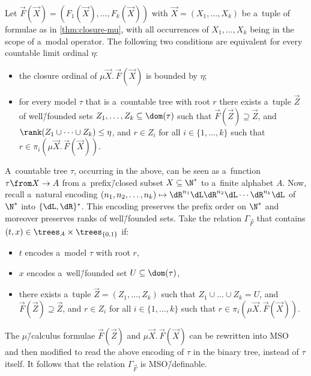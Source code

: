 \begin{cor}\label{cor:mu-tree}
	Let $\vec{F}(\vec{X})=(F_1(\vec{X}),\dots,F_k(\vec{X}))$ with $\vec{X}=(X_1,\dots,X_k)$ be a~tuple of formulae as in \cref{thm:closure-mu}, with all occurrences of $X_1,\dots,X_k$ being in the scope of a~modal operator.
	The following two conditions are equivalent for every countable limit ordinal $\eta$:
	\begin{itemize}
	\item	the closure ordinal of $\mu \vec{X}.\,\vec{F}(\vec{X})$ is bounded by $\eta$;
	\item	for every model $\tau$ that is a~countable tree with root $r$ there exists a~tuple $\vec{Z}$ of well\=/founded sets $Z_1,\dots,Z_k\subseteq\dom(\tau)$
		such that $\vec{F}(\vec{Z})\supseteq\vec{Z}$, and $\rank(Z_1\cup\dots\cup Z_k)\leq\eta$, and $r\in Z_i$ for all $i\in\{1,\dots,k\}$ such that $r\in\pi_i(\mu \vec{X}.\,\vec{F}(\vec{X}))$.
	\end{itemize}
\end{cor}
\noindent %
A~countable tree $\tau$, occurring in the  above, can be seen as a~function $\tau\from X\to A$ from a~prefix\=/closed subset $X\subseteq\N^\ast$ to a~finite alphabet $A$.
Now, recall a~natural encoding $(n_1,n_2,\ldots,n_k)\mapsto \dR^{n_1}\dL\dR^{n_2}\dL\cdots\dR^{n_k}\dL$ of $\N^\ast$ into $\{\dL,\dR\}^\ast$.
This encoding preserves the prefix order on $\N^\ast$ and moreover preserves ranks of well\=/founded sets.
Take the relation $\Gamma_{\!\!\vec{F}}$ that contains $(t,x)\in\trees_A\times\trees_{\{0,1\}}$ if:
\begin{itemize}
\item	$t$ encodes a~model $\tau$ with root $r$,
\item	$x$ encodes a~well\=/founded set $U\subseteq\dom(\tau)$,
\item	there exists a~tuple $\vec{Z}=(Z_1,\dots,Z_k)$ such that $Z_1\cup\dots\cup Z_k=U$, and $\vec{F}(\vec{Z})\supseteq\vec{Z}$,
	and $r\in Z_i$ for all $i\in\{1,\dots,k\}$ such that $r\in\pi_i(\mu \vec{X}.\,\vec{F}(\vec{X}))$.
\end{itemize}
The $\mu$\=/calculus formulae $\vec{F}(\vec{Z})$ and $\mu\vec{X}.\,\vec{F}(\vec{X})$ can be rewritten into MSO~\cite{julian-igor-handook}
and then modified to read the above encoding of $\tau$ in the binary tree, instead of $\tau$ itself.
It follows that the relation $\Gamma_{\!\!\vec{F}}$ is MSO\=/definable.

